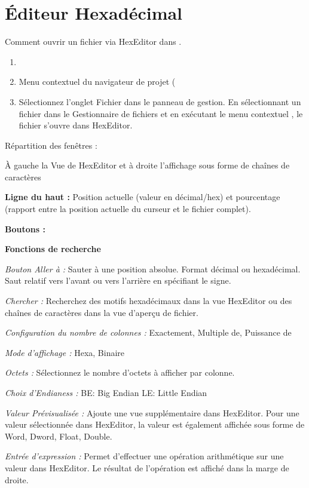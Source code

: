 \section{Éditeur Hexadécimal}\label{sec:hexeditor}

Comment ouvrir un fichier via HexEditor dans \codeblocks.

\begin{enumerate}
\item {}
\item Menu contextuel du navigateur de projet (
\item Sélectionnez l'onglet Fichier dans le panneau de gestion. En sélectionnant un fichier dans le Gestionnaire de fichiers et en exécutant le menu contextuel , le fichier s'ouvre dans HexEditor.
\end{enumerate}

Répartition des fenêtres :

À gauche la Vue de HexEditor et à droite l'affichage sous forme de chaînes de caractères

\textbf{Ligne du haut :}
Position actuelle (valeur en décimal/hex) et pourcentage (rapport entre la position actuelle du curseur et le fichier complet).

\textbf{Boutons :}

\textbf{Fonctions de recherche}

\textit{Bouton Aller à :}
Sauter à une position absolue. Format décimal ou hexadécimal. Saut relatif vers l'avant ou vers l'arrière en spécifiant le signe.

\textit{Chercher :}
 Recherchez des motifs hexadécimaux dans la vue HexEditor ou des chaînes de caractères dans la vue d'aperçu de fichier.

\textit{Configuration du nombre de colonnes :}
Exactement, Multiple de, Puissance de

\textit{Mode d'affichage :}
Hexa, Binaire

\textit{Octets :}
Sélectionnez le nombre d'octets à afficher par colonne.

\textit{Choix d'Endianess :}
BE: Big Endian
LE: Little Endian

\textit{Valeur Prévisualisée :}
Ajoute une vue supplémentaire dans HexEditor. Pour une valeur sélectionnée dans HexEditor, la valeur est également affichée sous forme de Word, Dword, Float, Double.

\textit{Entrée d'expression :}
Permet d'effectuer une opération arithmétique sur une valeur dans HexEditor. Le résultat de l'opération est affiché dans la marge de droite.

